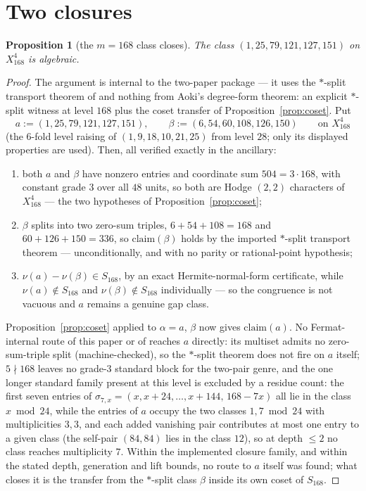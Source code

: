 \documentclass[11pt]{amsart}
\newtheorem{proposition}[theorem]{Proposition}
\theoremstyle{remark}
\begin{document}
\section{Two closures}\label{sec:closures}

\begin{proposition}[the $m=168$ class closes]\label{prop:w168}
The class $(1,25,79,121,127,151)$ on $X^4_{168}$ is algebraic.
\end{proposition}

\begin{proof}
The argument is internal to the two-paper package --- it uses the $*$-split transport theorem of
\cite{BN} and nothing from Aoki's degree-form theorem: an explicit $*$-split witness at level
$168$ plus the coset transfer of Proposition~\ref{prop:coset}. Put
\[
a:=(1,25,79,121,127,151),\qquad \beta:=(6,54,60,108,126,150)\qquad\text{on }X^4_{168}
\]
(the $6$-fold level raising of $(1,9,18,10,21,25)$ from level $28$; only its displayed properties
are used). Then, all verified exactly in the ancillary:
\begin{enumerate}
\item[(a)] both $a$ and $\beta$ have nonzero entries and coordinate sum $504=3\cdot168$, with
constant grade $3$ over all $48$ units, so both are Hodge $(2,2)$ characters of $X^4_{168}$ ---
the two hypotheses of Proposition~\ref{prop:coset};
\item[(b)] $\beta$ splits into two zero-sum triples,
$6+54+108=168$ and $60+126+150=336$, so $\mathrm{claim}(\beta)$ holds by the imported
$*$-split transport theorem \cite[Thm.~A]{BN} --- unconditionally, and with no parity or
rational-point hypothesis;
\item[(c)] $\nu(a)-\nu(\beta)\in S_{168}$, by an exact Hermite-normal-form certificate,
while $\nu(a)\notin S_{168}$ and $\nu(\beta)\notin S_{168}$ individually --- so the
congruence is not vacuous and $a$ remains a genuine gap class.
\end{enumerate}
Proposition~\ref{prop:coset} applied to $\alpha=a$, $\beta$ now gives $\mathrm{claim}(a)$.
No Fermat-internal route of this paper or of \cite{BN} reaches $a$ directly: its multiset admits
no zero-sum-triple split (machine-checked), so the $*$-split theorem does not fire on $a$ itself;
$5\nmid168$ leaves no grade-$3$ standard block for the two-pair genre, and the one longer
standard family present at this level is excluded by a residue count: the first seven entries of
$\sigma_{7,x}=(x,x+24,\dots,x+144,\,168-7x)$ all lie in the class $x\bmod24$, while the entries
of $a$ occupy the two classes $1,7\bmod24$ with multiplicities $3,3$, and each added vanishing
pair contributes at most one entry to a given class (the self-pair $(84,84)$ lies in the class
$12$), so at depth $\le2$ no class reaches multiplicity $7$. Within the implemented closure
family, and within the stated depth, generation and lift bounds, no route to $a$ itself was
found; what closes it is the transfer from the $*$-split class $\beta$ inside its own coset of
$S_{168}$.
\end{proof}
\end{document}
